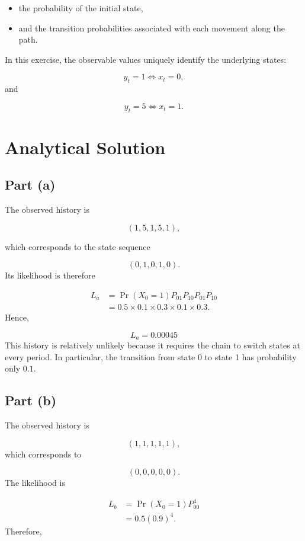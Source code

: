 \documentclass[11pt]{article}
\begin{document}
\begin{itemize}
    \item the probability of the initial state,
    \item and the transition probabilities associated with each movement along the path.
\end{itemize}
In this exercise, the observable values uniquely identify the underlying states:

\[
y_t=1 \Longleftrightarrow x_t=0,
\]
and

\[
y_t=5 \Longleftrightarrow x_t=1.
\]

\section*{Analytical Solution}

\subsection*{Part (a)}

The observed history is

\[
(1,5,1,5,1),
\]

which corresponds to the state sequence

\[
(0,1,0,1,0).
\]
Its likelihood is therefore

\[
\begin{aligned}
L_a
&=
\Pr(X_0=1)
P_{01}
P_{10}
P_{01}
P_{10} \\
&=
0.5
\times 0.1
\times 0.3
\times 0.1
\times 0.3.
\end{aligned}
\]
Hence,

\[
\boxed{
L_a = 0.00045
}
\]
This history is relatively unlikely because it requires the chain to switch states at every period. In particular, the transition from state 0 to state 1 has probability only \(0.1\).

\subsection*{Part (b)}

The observed history is

\[
(1,1,1,1,1),
\]
which corresponds to

\[
(0,0,0,0,0).
\]
The likelihood is

\[
\begin{aligned}
L_b
&=
\Pr(X_0=1)
P_{00}^4 \\
&=
0.5(0.9)^4.
\end{aligned}
\]
Therefore,
\end{document}
